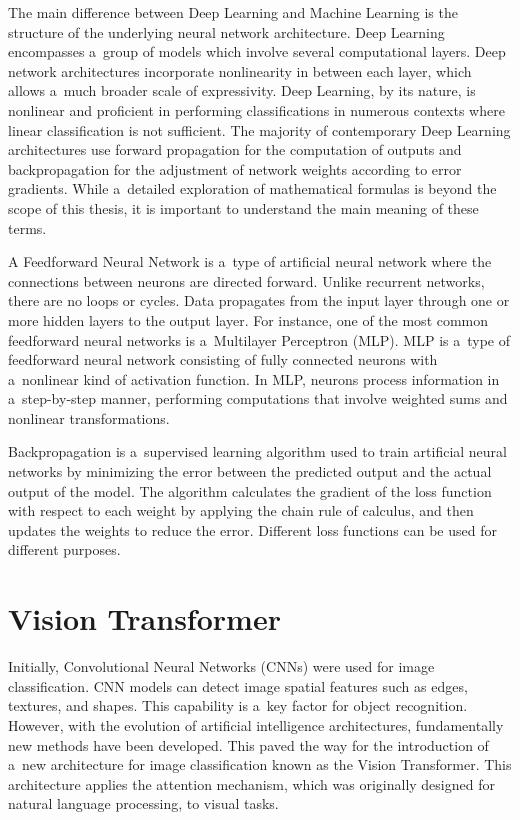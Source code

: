 The main difference between Deep Learning and Machine Learning is the structure of the underlying neural network architecture. Deep Learning encompasses a~group of models which involve several computational layers. Deep network architectures incorporate nonlinearity in between each layer, which allows a~much broader scale of expressivity. Deep Learning, by its nature, is nonlinear and proficient in performing classifications in numerous contexts where linear classification is not sufficient. The majority of contemporary Deep Learning architectures use forward propagation for the computation of outputs and backpropagation for the adjustment of network weights according to error gradients. While a~detailed exploration of mathematical formulas is beyond the scope of this thesis, it is important to understand the main meaning of these terms.

A Feedforward Neural Network is a~type of artificial neural network where the connections between neurons are directed forward. Unlike recurrent networks, there are no loops or cycles. Data propagates from the input layer through one or more hidden layers to the output layer. For instance, one of the most common feedforward neural networks is a~Multilayer Perceptron (MLP). MLP is a~type of feedforward neural network consisting of fully connected neurons with a~nonlinear kind of activation function. In MLP, neurons process information in a~step-by-step manner, performing computations that involve weighted sums and nonlinear transformations.

Backpropagation is a~supervised learning algorithm used to train artificial neural networks by minimizing the error between the predicted output and the actual output of the model. The algorithm calculates the gradient of the loss function with respect to each weight by applying the chain rule of calculus, and then updates the weights to reduce the error. Different loss functions can be used for different purposes.

\section{Vision Transformer}

Initially, Convolutional Neural Networks (CNNs) were used for image classification. CNN models can detect image spatial features such as edges, textures, and shapes. This capability is a~key factor for object recognition. However, with the evolution of artificial intelligence architectures, fundamentally new methods have been developed. This paved the way for the introduction of a~new architecture for image classification known as the Vision Transformer. This architecture applies the attention mechanism, which was originally designed for natural language processing, to visual tasks.

